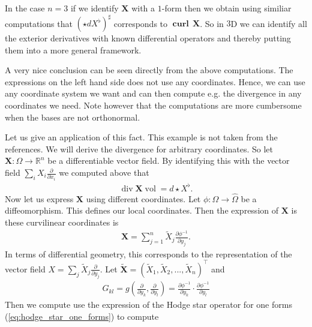 \documentclass[12pt,a4paper]{article}
\numberwithin{equation}{subsection}
\numberwithin{lemma}{subsection}
\theoremstyle{definition}
\DeclareMathOperator{\curl}{curl}
\DeclareMathOperator{\diver}{div}
\DeclareMathOperator{\vol}{vol}
\newcommand{\real}{\mathbb{R}}
\begin{document}
In the case $n=3$ if we identify $\mathbf{X}$ with a $1$-form then 
we obtain using similiar computations
that $(\star d X^\flat)^\sharp$ corresponds to  $\mathbf{\curl} \,\mathbf{X}$.
So in $3$D we can identify all the exterior derivatives with known differential
operators and thereby putting them into a more general framework.

A very nice conclusion can be seen directly from the above computations. The 
expressions on the left hand side does not use any coordinates. Hence, 
we can use any coordinate system we want and can then compute e.g. the 
divergence in any coordinates we need. Note however that the computations are
more cumbersome when the bases are not orthonormal.

Let us give an application of this fact. This example is not taken from the 
references. We will derive the divergence for arbitrary coordinates. 
So let $\mathbf{X}: \Omega \rightarrow \real^n$ be a differentiable vector field. By 
identifying this with the vector field $\sum_i X_i \frac{\partial}{\partial x_i}
$ we computed above that 
\begin{align*}
    \diver \mathbf{X} \vol = d \star X^\flat.
\end{align*}
Now let us express $\mathbf{X}$ using different coordinates. 
Let $\phi: \Omega \rightarrow \hat{\Omega}$ be a diffeomorphism. 
This defines our local coordinates. Then the expression of $\mathbf{X}$ is
these curvilinear coordinates is
\begin{align*}
    \mathbf{X} = \sum_{j=1}^n \tilde{X}_j 
        \frac{\partial \phi^{-1}}{\partial y_j}.
\end{align*}
In terms of differential geometry, this corresponds to the representation of the vector field 
$X = \sum_j \tilde{X}_j \frac{\partial}{\partial y_j}$. 
Let $\tilde{\mathbf{X}} = (\tilde{X}_1, \tilde{X}_2, ..., \tilde{X}_n)^\top$ 
and 
\begin{align*}
    G_{kl} = g(\frac{\partial}{\partial y_k}, \frac{\partial}{\partial y_l})
        = \frac{\partial \phi^{-1}}{\partial y_k} \cdot 
            \frac{\partial \phi^{-1}}{\partial y_l}
\end{align*}
Then we compute use the expression of the Hodge star operator 
for one forms (\ref{eq:hodge_star_one_forms}) to compute
\end{document}
